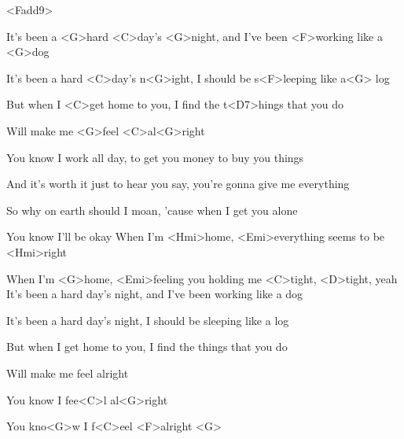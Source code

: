 

<Fadd9>

\zs

It's been a <G>hard <C>day's <G>night, and I've been <F>working like a <G>dog

It's been a hard <C>day's n<G>ight, I should be s<F>leeping like a<G> log

But when I <C>get home to you, I find the t<D7>hings that you do

Will make me <G>feel <C>al<G>right
\ks
\zs

You know I work all day, to get you money to buy you things

And it's worth it just to hear you say, you're gonna give me everything

So why on earth should I moan, 'cause when I get you alone

You know I'll be okay
\ks
\zr
When I'm <Hmi>home, <Emi>everything seems to be <Hmi>right

When I'm <G>home, <Emi>feeling you holding me <C>tight, <D>tight, yeah
\kr
\zs
It's been a hard day's night, and I've been working like a dog

It's been a hard day's night, I should be sleeping like a log

But when I get home to you, I find the things that you do

Will make me feel alright

You know I fee<C>l al<G>right

You kno<G>w I f<C>eel <F>alright <G> 
\ks
\kp
